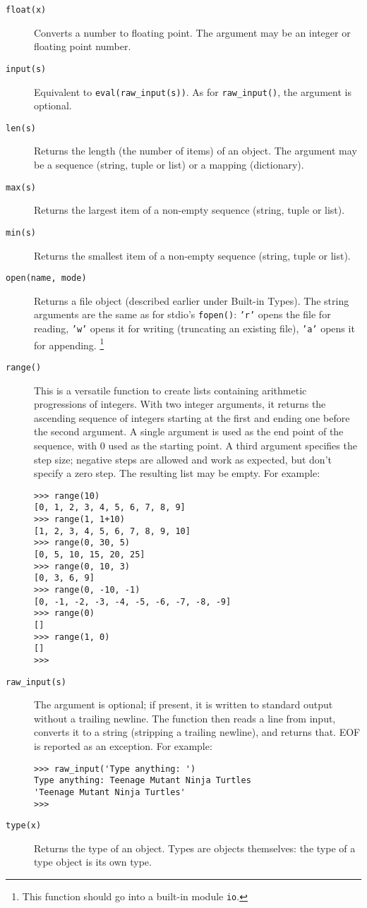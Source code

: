 \begin{description}
\item[{\tt float(x)}]
Converts a number to floating point.
The argument may be an integer or floating point number.
\item[{\tt input(s)}]
Equivalent to
{\tt eval(raw\_input(s))}.
As for
{\tt raw\_input()},
the argument is optional.
\item[{\tt len(s)}]
Returns the length (the number of items) of an object.
The argument may be a sequence (string, tuple or list) or a mapping
(dictionary).
\item[{\tt max(s)}]
Returns the largest item of a non-empty sequence (string, tuple or list).
\item[{\tt min(s)}]
Returns the smallest item of a non-empty sequence (string, tuple or list).
\item[{\tt open(name, mode)}]
Returns a file object (described earlier under Built-in Types).
The string arguments are the same as for stdio's
{\tt fopen()}:
{\tt 'r'}
opens the file for reading,
{\tt 'w'}
opens it for writing (truncating an existing file),
{\tt 'a'}
opens it for appending.%
\footnote{
This function should go into a built-in module
{\tt io}.
}
\item[{\tt range()}]
This is a versatile function to create lists containing arithmetic
progressions of integers.
With two integer arguments, it returns the ascending sequence of
integers starting at the first and ending one before the second
argument.
A single argument is used as the end point of the sequence, with 0 used
as the starting point.
A third argument specifies the step size; negative steps are allowed and
work as expected, but don't specify a zero step.
The resulting list may be empty.
For example:
\bcode\begin{verbatim}
>>> range(10)
[0, 1, 2, 3, 4, 5, 6, 7, 8, 9]
>>> range(1, 1+10)
[1, 2, 3, 4, 5, 6, 7, 8, 9, 10]
>>> range(0, 30, 5)
[0, 5, 10, 15, 20, 25]
>>> range(0, 10, 3)
[0, 3, 6, 9]
>>> range(0, -10, -1)
[0, -1, -2, -3, -4, -5, -6, -7, -8, -9]
>>> range(0)
[]
>>> range(1, 0)
[]
>>> 
\end{verbatim}\ecode
\item[{\tt raw\_input(s)}]
The argument is optional; if present, it is written to standard output
without a trailing newline.
The function then reads a line from input, converts it to a string
(stripping a trailing newline), and returns that.
EOF is reported as an exception.
For example:
\bcode\begin{verbatim}
>>> raw_input('Type anything: ')
Type anything: Teenage Mutant Ninja Turtles
'Teenage Mutant Ninja Turtles'
>>> 
\end{verbatim}\ecode
\item[{\tt type(x)}]
Returns the type of an object.
Types are objects themselves:
the type of a type object is its own type.
\end{description}

